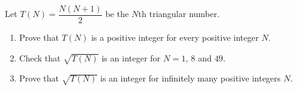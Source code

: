 Let $T(N)=\dfrac{N(N+1)}{2}$ be the $N$th triangular number.
\begin{enumerate}
\item[(a)] Prove that $T(N)$ is a positive integer for every positive integer $N$.
\item[(b)] Check that $\sqrt{T(N)}$ is an integer for $N=1$, $8$ and $49$.
\item[(c)] Prove that $\sqrt{T(N)}$ is an integer for infinitely many positive integers $N$.
\end{enumerate}
